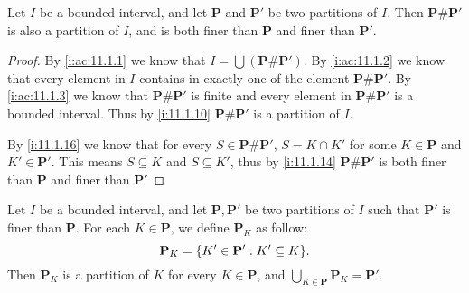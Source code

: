 \setcounter{thm}{17}
\begin{lem}\label{i:11.1.18}
  Let \(I\) be a bounded interval, and let \(\mathbf{P}\) and \(\mathbf{P}'\) be two partitions of \(I\).
  Then \(\mathbf{P} \# \mathbf{P}'\) is also a partition of \(I\), and is both finer than \(\mathbf{P}\) and finer than \(\mathbf{P}'\).
\end{lem}

\begin{proof}
  By \cref{i:ac:11.1.1} we know that \(I = \bigcup (\mathbf{P} \# \mathbf{P}')\).
  By \cref{i:ac:11.1.2} we know that every element in \(I\) contains in exactly one of the element \(\mathbf{P} \# \mathbf{P}'\).
  By \cref{i:ac:11.1.3} we know that \(\mathbf{P} \# \mathbf{P}'\) is finite and every element in  \(\mathbf{P} \# \mathbf{P}'\) is a bounded interval.
  Thus by \cref{i:11.1.10} \(\mathbf{P} \# \mathbf{P}'\) is a partition of \(I\).

  By \cref{i:11.1.16} we know that for every \(S \in \mathbf{P} \# \mathbf{P}'\), \(S = K \cap K'\) for some \(K \in \mathbf{P}\) and \(K' \in \mathbf{P}'\).
  This means \(S \subseteq K\) and \(S \subseteq K'\), thus by \cref{i:11.1.14} \(\mathbf{P} \# \mathbf{P}'\) is both finer than \(\mathbf{P}\) and finer than \(\mathbf{P}'\)
\end{proof}

\begin{ac}\label{i:ac:11.1.4}
  Let \(I\) be a bounded interval, and let \(\mathbf{P}, \mathbf{P}'\) be two partitions of \(I\) such that \(\mathbf{P}'\) is finer than \(\mathbf{P}\).
  For each \(K \in \mathbf{P}\), we define \(\mathbf{P}_K\) as follow:
  \[
    \mathbf{P}_K = \set{K' \in \mathbf{P}' : K' \subseteq K}.
  \]
  Then \(\mathbf{P}_K\) is a partition of \(K\) for every \(K \in \mathbf{P}\), and \(\bigcup_{K \in \mathbf{P}} \mathbf{P}_K = \mathbf{P}'\).
\end{ac}

